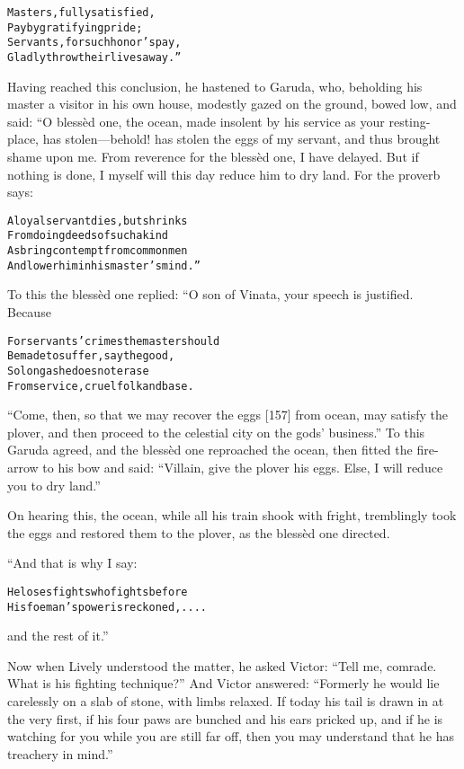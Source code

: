 \documentclass{article}
\renewenvironment{verbatim}{\begin{alltt}\normalfont\begin{centering}}{\end{centering}\end{alltt}}
\begin{document}
\begin{verbatim}
Masters, fully satisfied,
Pay by gratifying pride;
Servants, for such honor's pay,
Gladly throw their lives away.”
\end{verbatim}
Having reached this conclusion, he hastened to Garuda, who,
beholding his master a visitor in his own house, modestly gazed on
the ground, bowed low, and said: “O blessèd one, the ocean, made
insolent by his service as your resting-place, has stolen---behold!
has stolen the eggs of my servant, and thus brought shame upon me.
From reverence for the blessèd one, I have delayed. But if nothing
is done, I myself will this day reduce him to dry land. For the
proverb says:

\begin{verbatim}
A loyal servant dies, but shrinks
    From doing deeds of such a kind
As bring contempt from common men
    And lower him in his master's mind.”
\end{verbatim}
To this the blessèd one replied: “O son of Vinata, your speech is
justified. Because

\begin{verbatim}
For servants' crimes the master should
Be made to suffer, say the good,
So long as he does not erase
From service, cruel folk and base.
\end{verbatim}
``Come, then, so that we may recover the eggs [157] from ocean, may satisfy the plover, and then proceed to the celestial city on the gods' business.''
To this Garuda agreed, and the blessèd one reproached the ocean,
then fitted the fire-arrow to his bow and said:
``Villain, give the plover his eggs. Else, I will reduce you to dry land.''

On hearing this, the ocean, while all his train shook with fright,
tremblingly took the eggs and restored them to the plover, as the
blessèd one directed.

“And that is why I say:

\begin{verbatim}
He loses fights who fights before
    His foeman's power is reckoned, ....
\end{verbatim}
and the rest of it.”

Now when Lively understood the matter, he asked Victor:
``Tell me, comrade. What is his fighting technique?'' And Victor
answered:
``Formerly he would lie carelessly on a slab of stone, with limbs relaxed. If today his tail is drawn in at the very first, if his four paws are bunched and his ears pricked up, and if he is watching for you while you are still far off, then you may understand that he has treachery in mind.''
\end{document}
